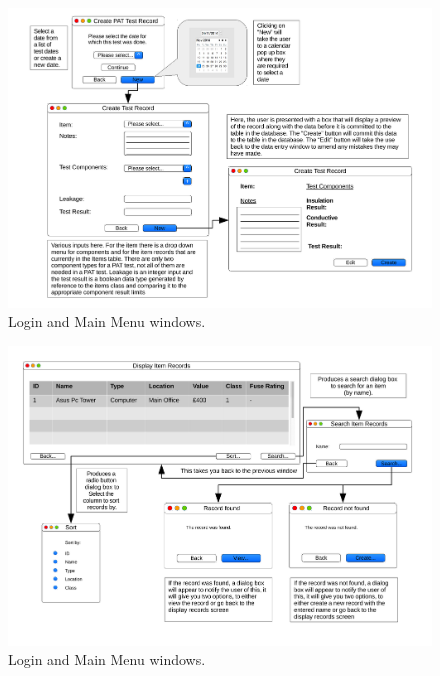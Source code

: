 \begin{landscape}
\newpage

\begin{figure}[H]
    \begin{center}
        \includegraphics[width=500px]{./Design/user_interface/Add_pat_test_record_interface.pdf}
    \end{center}
    \caption{Login and Main Menu windows.} \label{fig:print_function_result}
\end{figure}

\newpage

\begin{figure}[H]
    \begin{center}
        \includegraphics[width=500px]{./Design/user_interface/Display_item_records_interface.pdf}
    \end{center}
    \caption{Login and Main Menu windows.} \label{fig:print_function_result}
\end{figure}

\end{landscape}

